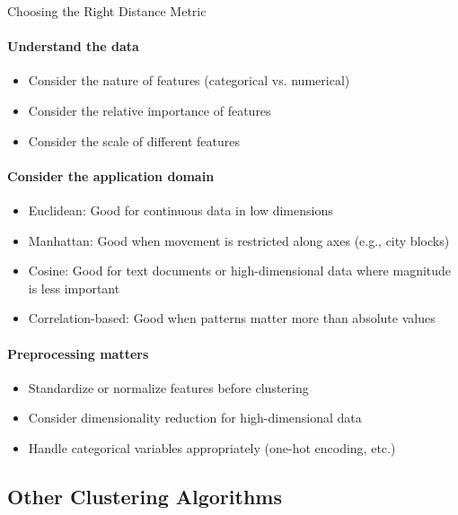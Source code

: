 \begin{KR}{Choosing the Right Distance Metric}\\
\paragraph{Understand the data}
\begin{itemize}
    \item Consider the nature of features (categorical vs. numerical)
    \item Consider the relative importance of features
    \item Consider the scale of different features
\end{itemize}

\paragraph{Consider the application domain}
\begin{itemize}
    \item Euclidean: Good for continuous data in low dimensions
    \item Manhattan: Good when movement is restricted along axes (e.g., city blocks)
    \item Cosine: Good for text documents or high-dimensional data where magnitude is less important
    \item Correlation-based: Good when patterns matter more than absolute values
\end{itemize}

\paragraph{Preprocessing matters}
\begin{itemize}
    \item Standardize or normalize features before clustering
    \item Consider dimensionality reduction for high-dimensional data
    \item Handle categorical variables appropriately (one-hot encoding, etc.)
\end{itemize}
\end{KR}

\subsection{Other Clustering Algorithms}

